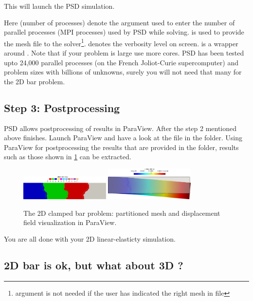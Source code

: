 This will launch the PSD simulation.

Here  (number of processes) denote the argument used to enter
the number of parallel processes (MPI processes) used by PSD while
solving.  is used to provide the mesh
file to the
solver\footnote{  argument is not needed if the user has indicated the right mesh in  file}.
 denotes the verbosity level on screen.  is a
wrapper around . Note that if your problem is large
use more cores. PSD has been tested upto 24,000 parallel processes (on
the French Joliot-Curie supercomputer) and problem sizes with billions
of unknowns, surely you will not need that many for the 2D bar problem.

\subsection{Step 3: Postprocessing}

PSD allows postprocessing of results in ParaView. After the step 2
mentioned above finishes. Launch ParaView and have a look at the
 file in the  folder. Using ParaView for
postprocessing the results that are provided in the 
folder, results such as those shown in \cref{bar-le-full-1} can be
extracted.

\begin{figure}[h!]
\centering
\includegraphics[align=t,width=0.4\textwidth]{./Images/le-2d-bar-partioned.png}\hfill
\includegraphics[align=t,width=0.4\textwidth]{./Images/le-2d-bar-results.png}
\caption{The 2D clamped bar problem: partitioned mesh and displacement field visualization in ParaView. \label{bar-le-full-1}}
\end{figure}

You are all done with your 2D linear-elasticty simulation.

\subsection{2D bar is ok, but what about 3D ?}

